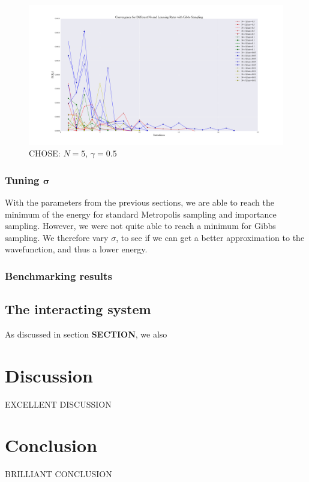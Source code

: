 \documentclass[a4paper, 10pt]{article}
\begin{document}
\begin{figure}
	\centering
	\includegraphics[width=\textwidth]{../Results/grad_gibbs.pdf}
	\caption{CHOSE: $N=5$, $\gamma=0.5$}\label{fig:step_size_and_N_gibbs}
\end{figure}
\subsubsection{Tuning $\boldsymbol{\sigma}$}
With the parameters from the previous sections, we are able to reach the minimum of the energy for standard Metropolis sampling and importance sampling. However, we were not quite able to reach a minimum for Gibbs sampling. We therefore vary $\sigma$, to see if we can get a better approximation to the wavefunction, and thus a lower energy.
\subsubsection{Benchmarking results}
\subsection{The interacting system}
As discussed in section \textbf{SECTION}, we also 


	\section{Discussion}
	EXCELLENT DISCUSSION
	\section{Conclusion}
	BRILLIANT CONCLUSION
\end{document}
